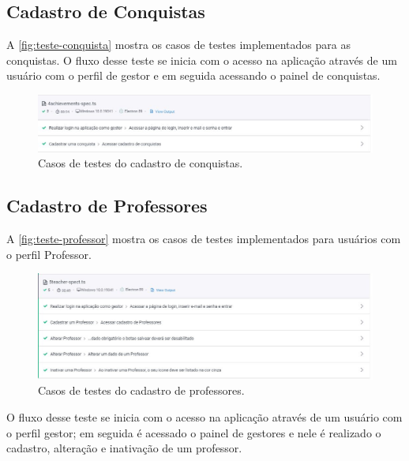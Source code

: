 \subsection{Cadastro de Conquistas}
A \autoref{fig:teste-conquista} mostra os casos de testes implementados para as conquistas. O fluxo desse teste se inicia com o acesso na aplicação através de um usuário com o perfil de gestor e em seguida acessando o painel de  conquistas. 

\begin{figure}[htb]
    \centering
	\includegraphics[width=16cm]{imagens/TesteConquista.JPG}
	\caption{\label{fig:teste-conquista} Casos de testes do cadastro de conquistas.}
\end{figure}

\subsection{Cadastro de Professores}
A \autoref{fig:teste-professor} mostra os casos de testes implementados para usuários com o perfil Professor. 

\begin{figure}[htb]
    \centering
	\includegraphics[width=16cm]{imagens/TesteProfessor.JPG}
	\caption{\label{fig:teste-professor} Casos de testes do cadastro de professores.}
\end{figure}

O fluxo desse teste se inicia com o acesso na aplicação através de um usuário com o perfil gestor; em seguida é acessado o painel de gestores e nele é realizado o cadastro, alteração e inativação de um professor.

  